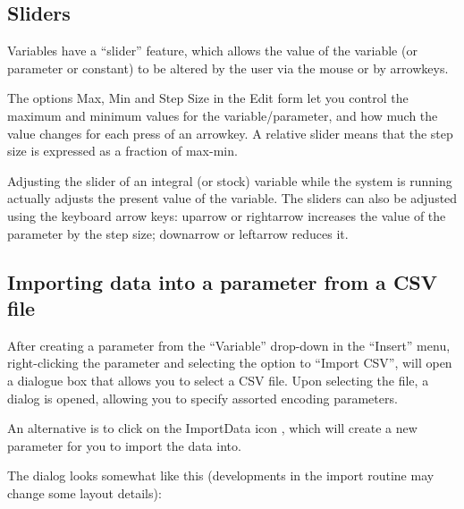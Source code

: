 \subsection{Sliders}

Variables have a ``slider'' feature, which allows the value of the
variable (or parameter or constant) to be altered by the user via
the mouse or by arrowkeys.

The options Max, Min and Step Size in the Edit form let you control
the maximum and minimum values for the variable/parameter, and how
much the value changes for each press of an arrowkey. A relative slider
means that the step size is expressed as a fraction of max-min.

Adjusting the slider of an integral (or stock) variable while the
system is running actually adjusts the present value of the variable.
The sliders can also be adjusted using the keyboard arrow keys: uparrow
\textuparrow{} or rightarrow \textrightarrow{} increases the value
of the parameter by the step size; downarrow \textdownarrow or leftarrow
\textleftarrow{} reduces it.

\subsection{Importing data into a parameter from a CSV file}

\label{CSV import} \label{Operation:csvImport}

After creating a parameter from the ``Variable'' drop-down in the
``Insert'' menu, right-clicking the parameter and selecting the
option to ``Import CSV'', will open a dialogue box that allows you
to select a CSV file. Upon selecting the file, a dialog is opened,
allowing you to specify assorted encoding parameters.

An alternative is to click on the ImportData icon ,
which will create a new parameter for you to import the data into.

The dialog looks somewhat like this (developments in the import routine
may change some layout details):
\begin{center}
\par\end{center}

